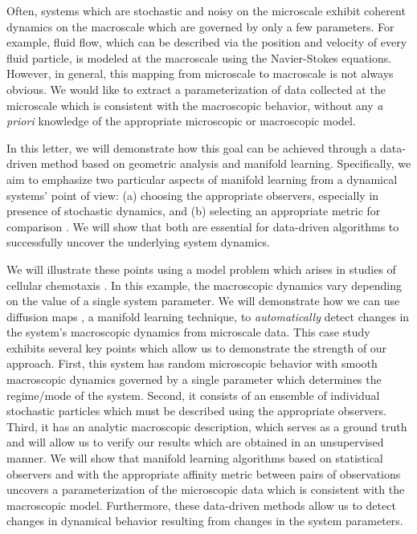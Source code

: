 \documentclass[prl, reprint]{revtex4-1}
\begin{document}
Often, systems which are stochastic and noisy on the microscale exhibit coherent dynamics on the macroscale which are governed by only a few parameters.
%
For example, fluid flow, which can be described via the position and velocity of every fluid particle, is modeled at the macroscale using the Navier-Stokes equations.
%
However, in general, this mapping from microscale to macroscale is not always obvious.
%
We would like to extract a parameterization of data collected at the microscale which is consistent with the macroscopic behavior, without any {\em a priori} knowledge of the appropriate microscopic or macroscopic model.

In this letter, we will demonstrate how this goal can be achieved through a data-driven method based on geometric analysis and manifold learning. 
%
Specifically, we aim to emphasize two particular aspects of manifold learning from a dynamical systems' point of view: (a) choosing the appropriate observers, especially in presence of stochastic dynamics, and (b) selecting an appropriate metric for comparison \cite{mallat2012group}. 
%
We will show that both are essential for data-driven algorithms to successfully uncover the underlying system dynamics. 

We will illustrate these points using a model problem which arises in studies of cellular chemotaxis \cite{othmer2000diffusion}.
%
In this example, the macroscopic dynamics vary depending on the value of a single system parameter.
%
We will demonstrate how we can use diffusion maps \cite{coifman2005geometric}, a manifold learning technique, to {\em automatically} detect changes in the system's macroscopic dynamics from microscale data.
%
This case study exhibits several key points which allow us to demonstrate the strength of our approach.
%
First, this system has random microscopic behavior with smooth macroscopic dynamics governed by a single parameter which determines the regime/mode of the system. 
%
Second, it consists of an ensemble of individual stochastic particles which must be described using the appropriate observers.
%
Third, it has an analytic macroscopic description, which serves as a ground truth and will allow us to verify our results which are obtained in an unsupervised manner.
%
We will show that manifold learning algorithms based on statistical observers and with the appropriate affinity metric between pairs of observations uncovers a parameterization of the microscopic data which is consistent with the macroscopic model.
%
Furthermore, these data-driven methods allow us to detect changes in dynamical behavior resulting from changes in the system parameters. 
\end{document}
